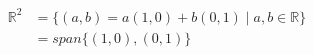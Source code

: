 \documentclass[preview]{standalone}
\begin{document}
\begin{align*}
\mathbb{R}^2& = \{ (a,b)= a(1,0)+b(0,1) \mid a , b \in \mathbb{R} \} \\ & = span \{ (1,0) , (0,1) \}
\end{align*}
\end{document}
